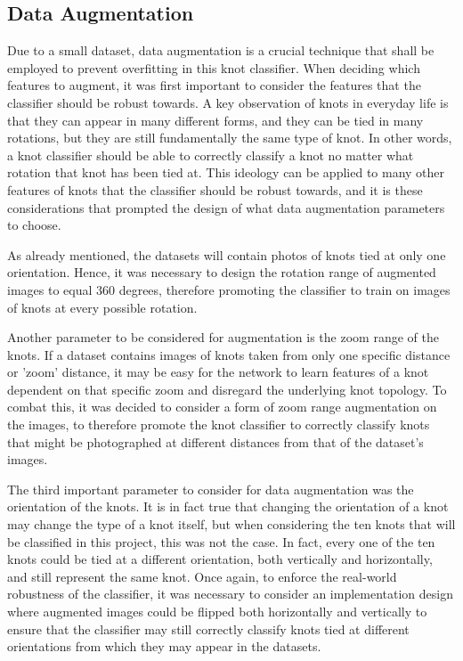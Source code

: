 \documentclass{l4proj}
\begin{document}
\subsection{Data Augmentation}
Due to a small dataset, data augmentation is a crucial technique that shall be employed to prevent overfitting in this knot classifier.
When deciding which features to augment, it was first important to consider the features that the classifier should be robust towards.
A key observation of knots in everyday life is that they can appear in many different forms, and they can be tied in many rotations, but they are still fundamentally the same type of knot.
In other words, a knot classifier should be able to correctly classify a knot no matter what rotation that knot has been tied at.
This ideology can be applied to many other features of knots that the classifier should be robust towards, and it is these considerations that prompted the design of what data augmentation parameters to choose.

As already mentioned, the datasets will contain photos of knots tied at only one orientation.
Hence, it was necessary to design the rotation range of augmented images to equal 360 degrees, therefore promoting the classifier to train on images of knots at every possible rotation.

Another parameter to be considered for augmentation is the zoom range of the knots.
If a dataset contains images of knots taken from only one specific distance or 'zoom' distance, it may be easy for the network to learn features of a knot dependent on that specific zoom and disregard the underlying knot topology.
To combat this, it was decided to consider a form of zoom range augmentation on the images, to therefore promote the knot classifier to correctly classify knots that might be photographed at different distances from that of the dataset's images.

The third important parameter to consider for data augmentation was the orientation of the knots.
It is in fact true that changing the orientation of a knot may change the type of a knot itself, but when considering the ten knots that will be classified in this project, this was not the case.
In fact, every one of the ten knots could be tied at a different orientation, both vertically and horizontally, and still represent the same knot.
Once again, to enforce the real-world robustness of the classifier, it was necessary to consider an implementation design where augmented images could be flipped both horizontally and vertically to ensure that the classifier may still correctly classify knots tied at different orientations from which they may appear in the datasets.
\end{document}
